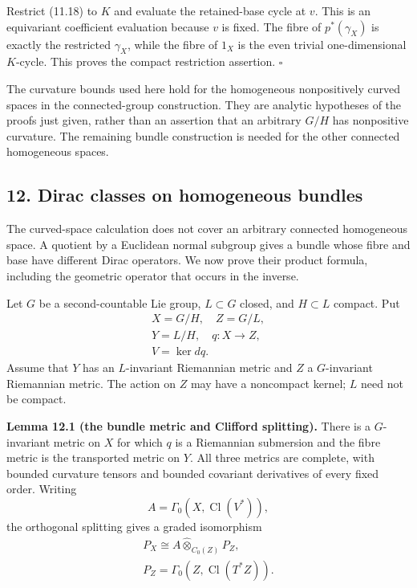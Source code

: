 \documentclass[
  11pt,
]{article}
\begin{document}
Restrict (11.18) to \(K\) and evaluate the retained-base cycle at \(v\).
This is an equivariant coefficient evaluation because \(v\) is fixed.
The fibre of \(p^*(\gamma_X)\) is exactly the restricted \(\gamma_X\),
while the fibre of \(1_X\) is the even trivial one-dimensional
\(K\)-cycle. This proves the compact restriction assertion. \(\square\)

The curvature bounds used here hold for the homogeneous nonpositively
curved spaces in the connected-group construction. They are analytic
hypotheses of the proofs just given, rather than an assertion that an
arbitrary \(G/H\) has nonpositive curvature. The remaining bundle
construction is needed for the other connected homogeneous spaces.

\subsection{12. Dirac classes on homogeneous
bundles}\label{dirac-classes-on-homogeneous-bundles}

The curved-space calculation does not cover an arbitrary connected
homogeneous space. A quotient by a Euclidean normal subgroup gives a
bundle whose fibre and base have different Dirac operators. We now prove
their product formula, including the geometric operator that occurs in
the inverse.

Let \(G\) be a second-countable Lie group, \(L\subset G\) closed, and
\(H\subset L\) compact. Put \[
\begin{gathered}
X=G/H,\quad Z=G/L,\\
Y=L/H,\quad q:X\longrightarrow Z,\\
V=\ker dq.
\end{gathered}
\tag{12.1}
\] Assume that \(Y\) has an \(L\)-invariant Riemannian metric and \(Z\)
a \(G\)-invariant Riemannian metric. The action on \(Z\) may have a
noncompact kernel; \(L\) need not be compact.

\textbf{Lemma 12.1 (the bundle metric and Clifford splitting).} There is
a \(G\)-invariant metric on \(X\) for which \(q\) is a Riemannian
submersion and the fibre metric is the transported metric on \(Y\). All
three metrics are complete, with bounded curvature tensors and bounded
covariant derivatives of every fixed order. Writing \[
A=\Gamma_0(X,\operatorname{Cl}(V^*)),
\tag{12.2}
\] the orthogonal splitting gives a graded isomorphism \[
\begin{gathered}
P_X\cong A\widehat\otimes_{C_0(Z)}P_Z,\\
P_Z=\Gamma_0(Z,\operatorname{Cl}(T^*Z)).
\end{gathered}
\tag{12.3}
\]
\end{document}

